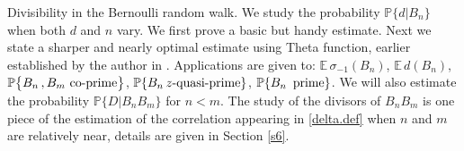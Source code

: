 \documentclass[11pt,draft,reqno]{amsart}
\makeatletter
\def\section{\@startsection{section}{1}%
     \z@{.7\linespacing\@plus\linespacing}{.5\linespacing}%
     {\bfseries%
     \centering
     }}
\theoremstyle{definition}
\theoremstyle{remarks}
\numberwithin{equation}{section}
\def \d{{\delta}}
\def \s{{\sigma}}
\def \qq{{\qquad}}
\def\P{{\mathcal P}}
\def\E{{\mathbb E \,}}
\def\P{{\mathbb P}}
\makeatother
\begin{document}
\section{Divisibility in the Bernoulli random walk.}
 \label{s3}
We study  the probability
  $ \P \{d|B_n \}$ when both $d$ and $n$ vary.    We first prove a basic but  handy estimate. Next we state a sharper and nearly optimal estimate using Theta function, earlier established by the author in \cite{W1}. 
  Applications are given to: 
   $\E \s_{-1}(B_n)$, $\E d(B_n)$,     $\P\big\{  B_n\, , B_m \ \hbox{co-prime} \big\}$, $\P\{ B_n\, \hbox{$z$-quasi-prime} \}$, $\P\{ B_n\,\hbox{  prime} \}$. We will  also estimate the probability $\P\{D|B_nB_m\}$ for $n<m$. The study of the divisors of $B_nB_m$  is one piece of the estimation of the correlation appearing in \eqref{delta.def} when $n$ and $m$ are relatively near,  details are given in Section \ref{s6}.


 



 
\end{document}
